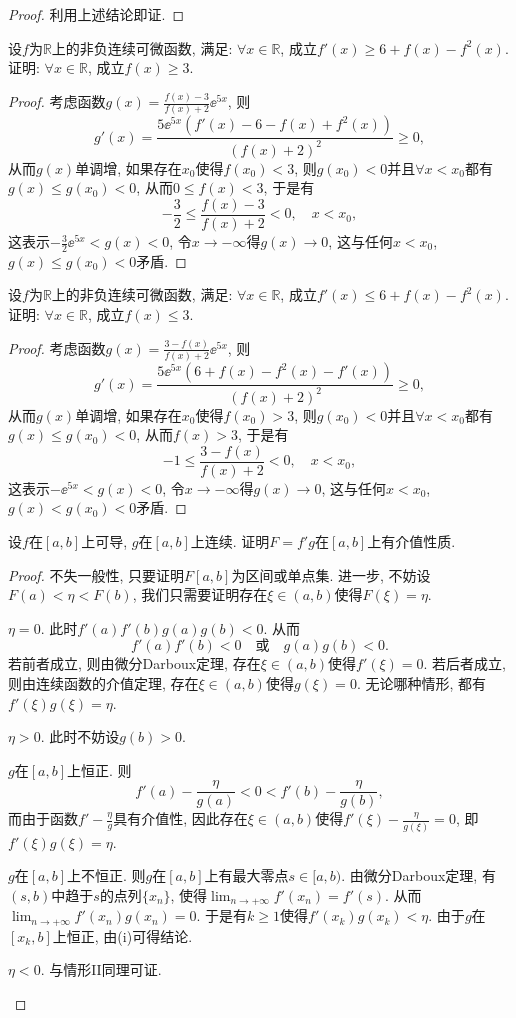 \begin{quizb}
\begin{proof}
利用上述结论即证.
\end{proof}
\woe 设\(f\)为\(\mathbb{R}\)上的非负连续可微函数, 满足: \(\forall x\in\mathbb{R}\), 成立\(f'(x)\geqslant 6+f(x)-f^2(x)\). 证明: \(\forall x\in\mathbb{R}\), 成立\(f(x)\geqslant 3\).
\begin{proof}
考虑函数\(g(x)=\frac{f(x)-3}{f(x)+2}\ee^{5x}\), 则\[g'(x)=\frac{5\ee^{5x}\left(f'(x)-6-f(x)+f^2(x)\right)}{\left(f(x)+2\right)^2}\geqslant 0,\]从而\(g(x)\)单调增, 如果存在\(x_0\)使得\(f(x_0)<3\), 则\(g(x_0)<0\)并且\(\forall x<x_0\)都有\(g(x)\leqslant g(x_0)<0\), 从而\(0\leqslant f(x)<3\), 于是有\[-\frac{3}{2}\leqslant\frac{f(x)-3}{f(x)+2}<0,\quad x<x_0,\]这表示\(-\frac{3}{2}\ee^{5x}<g(x)<0\), 令\(x\rightarrow-\infty\)得\(g(x)\rightarrow 0\), 这与任何\(x<x_0\), \(g(x)\leqslant g(x_0)<0\)矛盾.
\end{proof}
\woe 设\(f\)为\(\mathbb{R}\)上的非负连续可微函数, 满足: \(\forall x\in\mathbb{R}\), 成立\(f'(x)\leqslant 6+f(x)-f^2(x)\). 证明: \(\forall x\in\mathbb{R}\), 成立\(f(x)\leqslant 3\).
\begin{proof}
考虑函数\(g(x)=\frac{3-f(x)}{f(x)+2}\ee^{5x}\), 则\[g'(x)=\frac{5\ee^{5x}\left(6+f(x)-f^2(x)-f'(x)\right)}{\left(f(x)+2\right)^2}\geqslant 0,\]从而\(g(x)\)单调增, 如果存在\(x_0\)使得\(f(x_0)>3\), 则\(g(x_0)<0\)并且\(\forall x<x_0\)都有\(g(x)\leqslant g(x_0)<0\), 从而\(f(x)>3\), 于是有\[-1\leqslant\frac{3-f(x)}{f(x)+2}<0,\quad x<x_0,\]这表示\(-\ee^{5x}<g(x)<0\), 令\(x\rightarrow-\infty\)得\(g(x)\rightarrow 0\), 这与任何\(x<x_0\), \(g(x)<g(x_0)<0\)矛盾.
\end{proof}
\woe 设\(f\)在\([a,b]\)上可导, \(g\)在\([a,b]\)上连续. 证明\(F=f'g\)在\([a,b]\)上有介值性质.
\begin{proof}
不失一般性, 只要证明\(F[a,b]\)为区间或单点集. 进一步, 不妨设\(F(a)<\eta<F(b)\), 我们只需要证明存在\(\xi\in(a,b)\)使得\(F(\xi)=\eta\).
\begin{asparaenum}[\bfseries 情形 I]
\item \(\eta=0\). 此时\(f'(a)f'(b)g(a)g(b)<0\). 从而\[f'(a)f'(b)<0\quad\text{或}\quad g(a)g(b)<0.\]若前者成立, 则由微分Darboux定理, 存在\(\xi\in(a,b)\)使得\(f'(\xi)=0\). 若后者成立, 则由连续函数的介值定理, 存在\(\xi\in(a,b)\)使得\(g(\xi)=0\). 无论哪种情形, 都有\(f'(\xi)g(\xi)=\eta\).
\item \(\eta>0\). 此时不妨设\(g(b)>0\).
\begin{compactenum}[(i)]
\item \(g\)在\([a,b]\)上恒正. 则\[f'(a)-\frac{\eta}{g(a)}<0<f'(b)-\frac{\eta}{g(b)},\]而由于函数\(f'-\frac{\eta}{g}\)具有介值性, 因此存在\(\xi\in(a,b)\)使得\(f'(\xi)-\frac{\eta}{g(\xi)}=0\), 即\(f'(\xi)g(\xi)=\eta\).
\item \(g\)在\([a,b]\)上不恒正. 则\(g\)在\([a,b]\)上有最大零点\(s\in[a,b)\). 由微分Darboux定理, 有\((s,b)\)中趋于\(s\)的点列\(\{x_n\}\), 使得\(\lim_{n\rightarrow+\infty}f'(x_n)=f'(s)\). 从而\(\lim_{n\rightarrow+\infty}f'(x_n)g(x_n)=0\). 于是有\(k\geqslant 1\)使得\(f'(x_k)g(x_k)<\eta\). 由于\(g\)在\([x_k,b]\)上恒正, 由(i)可得结论.
\end{compactenum}
\item  \(\eta<0\). 与情形II同理可证.\qedhere
\end{asparaenum}
\end{proof}
\end{quizb}
